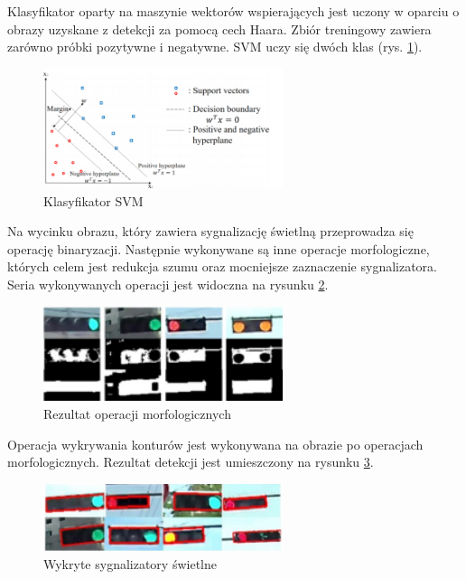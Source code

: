 Klasyfikator oparty na maszynie wektorów wspierających jest uczony w oparciu o obrazy uzyskane z detekcji za pomocą cech Haara. Zbiór treningowy zawiera zarówno próbki pozytywne i negatywne. SVM uczy się dwóch klas (rys. \ref{fig:traffic_light2_svm}).

\begin{figure}
  \centering
  \includegraphics[width=7cm]{img/traffic_light2_svm.png}
  \caption{Klasyfikator SVM\cite{T9}}
  \label{fig:traffic_light2_svm}
\end{figure}

Na wycinku obrazu, który zawiera sygnalizację świetlną przeprowadza się operację binaryzacji. Następnie wykonywane są inne operacje morfologiczne, których celem jest redukcja szumu oraz mocniejsze zaznaczenie sygnalizatora. Seria wykonywanych operacji jest widoczna na rysunku \ref{fig:traffic_light2_morph}.

\begin{figure}
  \centering
  \includegraphics[width=7cm]{img/traffic_light2_morph.png}
  \caption{Rezultat operacji morfologicznych\cite{T9}}
  \label{fig:traffic_light2_morph}
\end{figure}

Operacja wykrywania konturów jest wykonywana na obrazie po operacjach morfologicznych. Rezultat detekcji jest umieszczony na rysunku \ref{fig:traffic_light2_result}.

\begin{figure}
  \centering
  \includegraphics[width=7cm]{img/traffic_light2_results.png}
  \caption{Wykryte sygnalizatory świetlne\cite{T9}}
  \label{fig:traffic_light2_result}
\end{figure}

